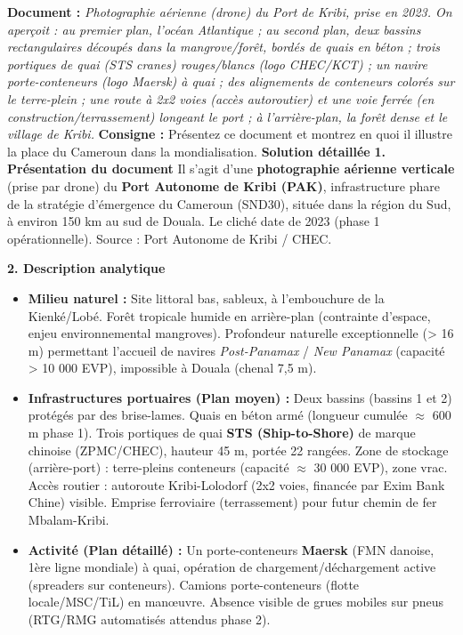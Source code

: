 \documentclass[11pt]{article}
\newcommand{\cle}[1]{{\popxbold\color{popdark}#1}}
\begin{document}
\begin{exoresolu}
\textbf{Document :} \textit{Photographie aérienne (drone) du Port de Kribi, prise en 2023. On aperçoit : au premier plan, l'océan Atlantique ; au second plan, deux bassins rectangulaires découpés dans la mangrove/forêt, bordés de quais en béton ; trois portiques de quai (STS cranes) rouges/blancs (logo CHEC/KCT) ; un navire porte-conteneurs (logo Maersk) à quai ; des alignements de conteneurs colorés sur le terre-plein ; une route à 2x2 voies (accès autoroutier) et une voie ferrée (en construction/terrassement) longeant le port ; à l'arrière-plan, la forêt dense et le village de Kribi.}
\textbf{Consigne :} Présentez ce document et montrez en quoi il illustre la place du Cameroun dans la mondialisation.
\tcblower
\textbf{Solution détaillée}
\textbf{1. Présentation du document}
Il s'agit d'une \textbf{photographie aérienne verticale} (prise par drone) du \textbf{Port Autonome de Kribi (PAK)}, infrastructure phare de la \cle{stratégie d'émergence du Cameroun (SND30)}, située dans la région du Sud, à environ 150 km au sud de Douala. Le cliché date de 2023 (phase 1 opérationnelle). Source : Port Autonome de Kribi / CHEC.

\textbf{2. Description analytique}
\begin{itemize}
    \item \textbf{Milieu naturel :} Site littoral bas, sableux, à l'embouchure de la Kienké/Lobé. Forêt tropicale humide en arrière-plan (contrainte d'espace, enjeu environnemental mangroves). Profondeur naturelle exceptionnelle (> 16 m) permettant l'accueil de navires \emph{Post-Panamax} / \emph{New Panamax} (capacité > 10 000 EVP), impossible à Douala (chenal 7,5 m).
    \item \textbf{Infrastructures portuaires (Plan moyen) :} Deux bassins (bassins 1 et 2) protégés par des brise-lames. Quais en béton armé (longueur cumulée $\approx$ 600 m phase 1). Trois portiques de quai \textbf{STS (Ship-to-Shore)} de marque chinoise (ZPMC/CHEC), hauteur 45 m, portée 22 rangées. Zone de stockage (arrière-port) : terre-pleins conteneurs (capacité $\approx$ 30 000 EVP), zone vrac. Accès routier : autoroute Kribi-Lolodorf (2x2 voies, financée par Exim Bank Chine) visible. Emprise ferroviaire (terrassement) pour futur chemin de fer Mbalam-Kribi.
    \item \textbf{Activité (Plan détaillé) :} Un porte-conteneurs \textbf{Maersk} (FMN danoise, 1ère ligne mondiale) à quai, opération de chargement/déchargement active (spreaders sur conteneurs). Camions porte-conteneurs (flotte locale/MSC/TiL) en manœuvre. Absence visible de grues mobiles sur pneus (RTG/RMG automatisés attendus phase 2).
\end{itemize}


\end{exoresolu}
\end{document}
